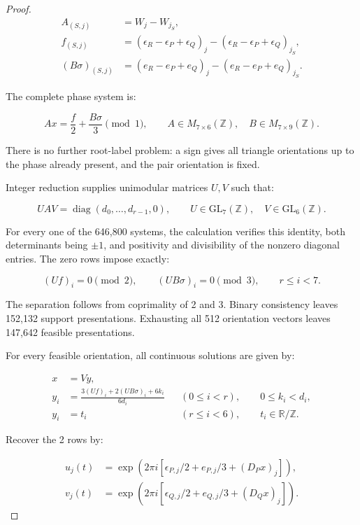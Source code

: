 \documentclass[11pt,a4paper]{article}
\theoremstyle{plain}
\theoremstyle{definition}
\theoremstyle{plain}
\begin{document}
\begin{proof}
$$\begin{aligned}
A_{(S,j)}&=W_j-W_{j_S},\\
f_{(S,j)}&=(\epsilon_R-\epsilon_P+\epsilon_Q)_j -(\epsilon_R-\epsilon_P+\epsilon_Q)_{j_S},\\
(B\sigma)_{(S,j)}&=(e_R-e_P+e_Q)_j-(e_R-e_P+e_Q)_{j_S}.
\end{aligned}$$

The complete phase system is:

$$Ax=\frac f2+\frac{B\sigma}{3}\pmod1, \qquad A\in M_{7\times6}(\mathbb Z),\quad B\in M_{7\times9}(\mathbb Z).$$

There is no further root-label problem: a sign gives all triangle orientations up to the phase already present, and the pair orientation is fixed.

\medskip
Integer reduction supplies unimodular matrices $U,V$ such that:

$$UAV=\operatorname{diag}(d_0,\ldots,d_{r-1},0), \qquad U\in\mathrm{GL}_7(\mathbb Z),\quad V\in\mathrm{GL}_6(\mathbb Z).$$

For every one of the 646,800 systems, the calculation verifies this identity, both determinants being $\pm1$, and positivity and divisibility of the nonzero diagonal entries. The zero rows impose exactly:

$$(Uf)_i=0\pmod2,\qquad (UB\sigma)_i=0\pmod3, \qquad r\leq i<7.$$

The separation follows from coprimality of 2 and 3. Binary consistency leaves 152,132 support presentations. Exhausting all 512 orientation vectors leaves 147,642 feasible presentations.

For every feasible orientation, all continuous solutions are given by:

$$\begin{aligned}
x&=Vy,\\
y_i&=\frac{3(Uf)_i+2(UB\sigma)_i+6k_i}{6d_i} && (0\leq i<r),\qquad 0\leq k_i<d_i,\\
y_i&=t_i &&(r\leq i<6),\qquad t_i\in\mathbb R/\mathbb Z.
\end{aligned}$$

Recover the 2 rows by:

$$\begin{aligned}
u_j(t)&=\exp\!\left(2\pi i\left[\epsilon_{P,j}/2+e_{P,j}/3+(D_Px)_j\right]\right),\\
v_j(t)&=\exp\!\left(2\pi i\left[\epsilon_{Q,j}/2+e_{Q,j}/3+(D_Qx)_j\right]\right).
\end{aligned}$$


\end{proof}
\end{document}
